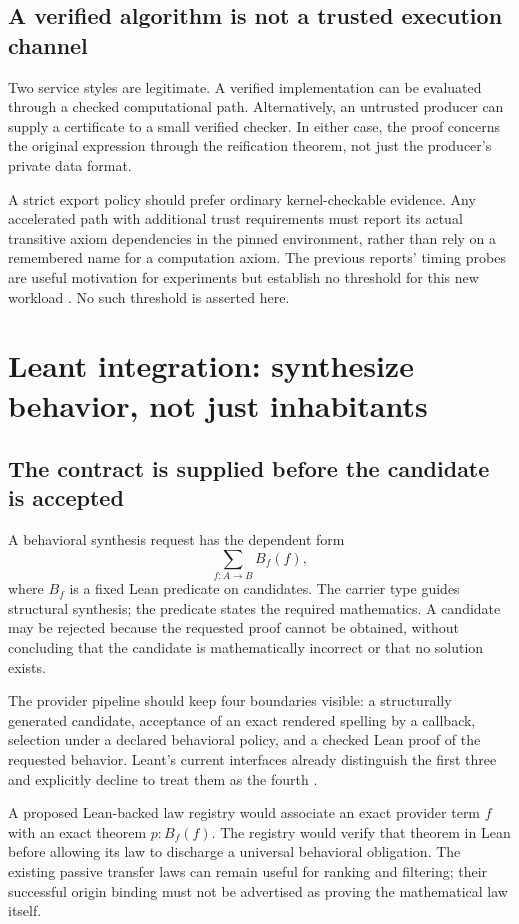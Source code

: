 \documentclass[11pt,a4paper]{article}
\theoremstyle{definition}
\theoremstyle{remark}
\begin{document}
\subsection{A verified algorithm is not a trusted execution channel}
Two service styles are legitimate. A verified implementation can be evaluated through a checked computational path. Alternatively, an untrusted producer can supply a certificate to a small verified checker. In either case, the proof concerns the original expression through the reification theorem, not just the producer's private data format.

A strict export policy should prefer ordinary kernel-checkable evidence. Any accelerated path with additional trust requirements must report its actual transitive axiom dependencies in the pinned environment, rather than rely on a remembered name for a computation axiom. The previous reports' timing probes are useful motivation for experiments but establish no threshold for this new workload \cite{synA,synB}. No such threshold is asserted here.

\section{Leant integration: synthesize behavior, not just inhabitants}
\label{sec:leant}

\subsection{The contract is supplied before the candidate is accepted}
A behavioral synthesis request has the dependent form
\[
 \sum_{f:A\to B} B_f(f),
\]
where $B_f$ is a fixed Lean predicate on candidates. The carrier type guides structural synthesis; the predicate states the required mathematics. A candidate may be rejected because the requested proof cannot be obtained, without concluding that the candidate is mathematically incorrect or that no solution exists.

The provider pipeline should keep four boundaries visible: a structurally generated candidate, acceptance of an exact rendered spelling by a callback, selection under a declared behavioral policy, and a checked Lean proof of the requested behavior. Leant's current interfaces already distinguish the first three and explicitly decline to treat them as the fourth \cite{leantVerification,leantBehavior,leantLength}.

A proposed Lean-backed law registry would associate an exact provider term $f$ with an exact theorem $p:B_f(f)$. The registry would verify that theorem in Lean before allowing its law to discharge a universal behavioral obligation. The existing passive transfer laws can remain useful for ranking and filtering; their successful origin binding must not be advertised as proving the mathematical law itself.
\end{document}
